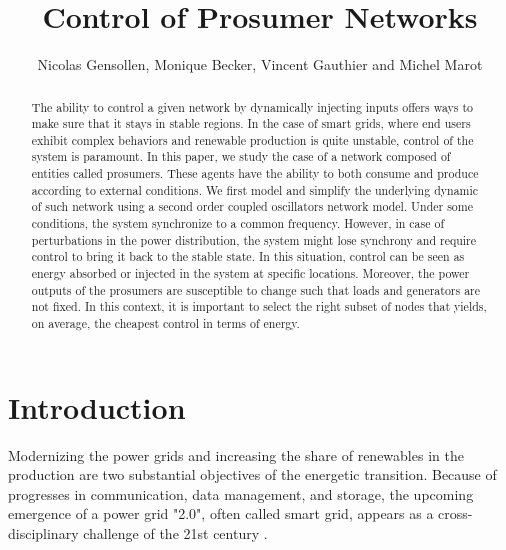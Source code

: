 \documentclass[conference]{IEEEtran}
\begin{document}
\pagestyle{plain}
\title{Control of Prosumer Networks}


\author{Nicolas Gensollen, Monique Becker, Vincent Gauthier and Michel Marot  \\
}


\maketitle


\begin{abstract}
The ability to control a given network by  dynamically injecting inputs offers ways to make sure that it stays in stable regions. In the case of smart grids, where end users exhibit complex behaviors and renewable production is quite unstable, control of the system  is paramount. In this paper, we study the case of a network composed of entities called prosumers. These agents have the ability to both consume and produce according to external conditions. We first model and simplify the underlying dynamic of such network using a second order coupled oscillators network model. Under some conditions, the system synchronize to a common frequency. However, in case of perturbations in the power distribution, the system might lose synchrony and require control to bring it back to the stable state. In this situation, control can be seen as energy  absorbed or injected in the system at specific locations. Moreover, the power outputs of the prosumers are susceptible to change such that loads and generators are not fixed. In this context, it is important to select the right subset of nodes that yields, on average, the cheapest control in terms of energy. 
\end{abstract}


\IEEEpeerreviewmaketitle


\section{Introduction}
\label{sec:introduction}

Modernizing the power grids and increasing the share of renewables in the production are two substantial objectives of the energetic transition. Because of progresses in communication, data management, and storage, the upcoming emergence of a power grid "2.0", often called smart grid, appears as a cross-disciplinary challenge of the 21st century \cite{Ramchurn}.
\end{document}

